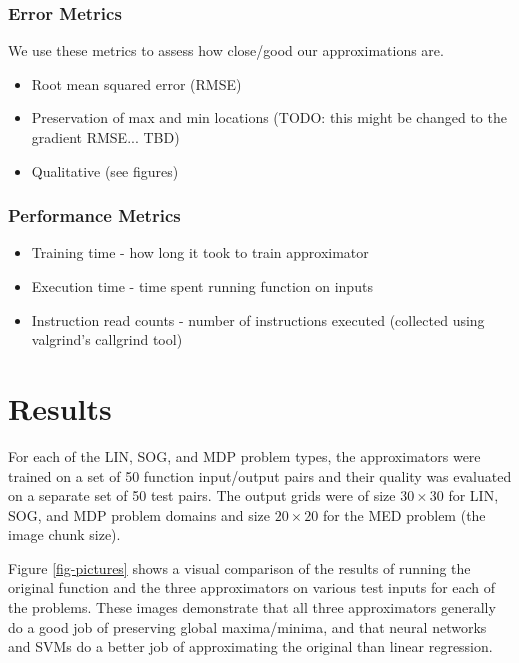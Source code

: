 \documentclass{article}
\begin{document}
\subsubsection{Error Metrics}
We use these metrics to assess how close/good our approximations are.

\begin{itemize}
\item Root mean squared error (RMSE)
\item Preservation of max and min locations (TODO: this might be changed to the gradient RMSE... TBD)
\item Qualitative (see figures)
\end{itemize}

\subsubsection{Performance Metrics}
\begin{itemize}
\item Training time - how long it took to train approximator
\item Execution time - time spent running function on inputs
\item Instruction read counts - number of instructions executed (collected using valgrind's callgrind tool)
\end{itemize}

\section{Results}

For each of the LIN, SOG, and MDP problem types, the approximators were trained on a set of 50 function input/output pairs and their quality was evaluated on a separate set of 50 test pairs. The output grids were of size $30 \times 30$ for LIN, SOG, and MDP problem domains and size $20 \times 20$ for the MED problem (the image chunk size).

Figure \ref{fig-pictures} shows a visual comparison of the results of running the original function and the three approximators on various test inputs for each of the problems. These images demonstrate that all three approximators generally do a good job of preserving global maxima/minima, and that neural networks and SVMs do a better job of approximating the original than linear regression.
\end{document}
